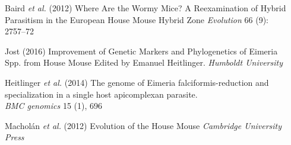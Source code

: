\documentclass[30pt, a0paper, portrait, margin=0mm, innermargin=15mm,
               blockverticalspace=15mm, colspace=15mm, subcolspace=8mm]{tikzposter}
\begin{document}
\begin{columns}
{\begin{center}
  \end{center}
}


      {
        \begin{small}
          
          \hangindent=2cm Baird \textit{et al.} (2012) Where Are the Wormy Mice? A Reexamination of Hybrid Parasitism in the European House Mouse Hybrid Zone
           \textit{Evolution} 66 (9): 2757--72

          \hangindent=2cm Jost (2016) Improvement of Genetic Markers and Phylogenetics of Eimeria Spp. from House Mouse
          Edited by Emanuel Heitlinger. \textit{Humboldt University}

          \hangindent=2cm Heitlinger \textit{et al.} (2014) The genome of Eimeria falciformis-reduction and specialization in a single host apicomplexan         parasite.\\ \textit{BMC genomics} 15 (1), 696
                    
          \hangindent=2cm Machol\'{a}n \textit{et al.} (2012) Evolution of the House Mouse
          \textit{Cambridge University Press}
          
        
          
        \end{small}
      }



\end{columns}



\end{document}

